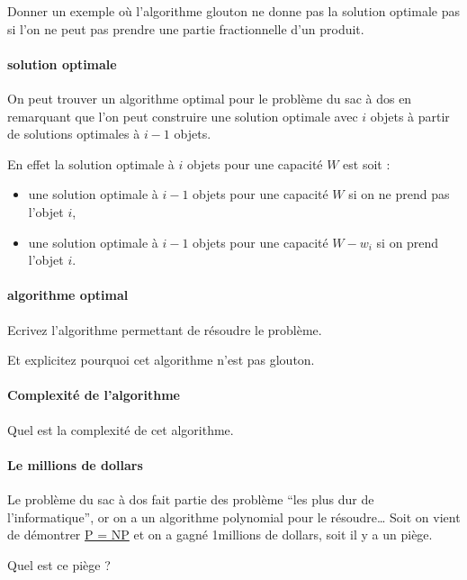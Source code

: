 \documentclass[
]{article}
\providecommand{\tightlist}{%
  \setlength{\itemsep}{0pt}\setlength{\parskip}{0pt}}
\begin{document}
Donner un exemple où l'algorithme glouton ne donne pas la solution
optimale pas si l'on ne peut pas prendre une partie fractionnelle d'un
produit.

\hypertarget{solution-optimale}{%
\paragraph{solution optimale}\label{solution-optimale}}

On peut trouver un algorithme optimal pour le problème du sac à dos en
remarquant que l'on peut construire une solution optimale avec $i$
objets à partir de solutions optimales à $i-1$ objets.

En effet la solution optimale à $i$ objets pour une capacité $W$ est
soit :

\begin{itemize}
\tightlist
\item
  une solution optimale à $i-1$ objets pour une capacité $W$ si on
  ne prend pas l'objet $i$,
\item
  une solution optimale à $i-1$ objets pour une capacité $W - w_i$
  si on prend l'objet $i$.
\end{itemize}

\hypertarget{algorithme-optimal}{%
\paragraph{algorithme optimal}\label{algorithme-optimal}}

Ecrivez l'algorithme permettant de résoudre le problème.

Et explicitez pourquoi cet algorithme n'est pas glouton.

\hypertarget{complexituxe9-de-lalgorithme}{%
\paragraph{Complexité de
l'algorithme}\label{complexituxe9-de-lalgorithme}}

Quel est la complexité de cet algorithme.

\hypertarget{le-millions-de-dollars}{%
\paragraph{Le millions de dollars}\label{le-millions-de-dollars}}

Le problème du sac à dos fait partie des problème ``les plus dur de
l'informatique'', or on a un algorithme polynomial pour le
résoudre\ldots{} Soit on vient de démontrer
\href{https://fr.wikipedia.org/wiki/Probl\%C3\%A8mes_du_prix_du_mill\%C3\%A9naire\#Probl\%C3\%A8me_ouvert_P_=_NP}{P
= NP} et on a gagné 1millions de dollars, soit il y a un piège.

Quel est ce piège ?
\end{document}
